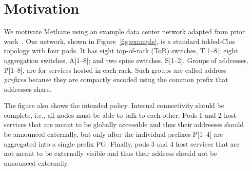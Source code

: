 \documentclass{sig-alternate-10pt}
\newcommand{\sysname}{{\small \sf Methane}\xspace}
\begin{document}


%
%
%
%

\section{Motivation}
\label{sec:motivation}


We motivate \sysname using an example data center network adapted from prior work~\cite{propane}. Our network, shown in Figure~\ref{fig:example}, is a standard folded-Clos topology with four pods. It has eight top-of-rack (ToR) switches, T[1--8]; eight aggregation switches, A[1--8]; and two spine switches, S[1--2]. Groups of addresses, P[1--8], are for services hosted in each rack. Such groups are called address {\em prefixes} because they are compactly encoded using the common prefix that addresses share.

The figure also shows the intended policy. Internal connectivity should be complete, i.e., all nodes must be able to talk to each other. Pods 1 and 2 host services that are meant to be globally accessible and thus their addresses should be announced externally, but only after the individual prefixes P[1--4] are aggregated into a single prefix PG. Finally, pods 3 and 4 host services that are not meant to be externally visible and thus their address should not be announced externally.
\end{document}
